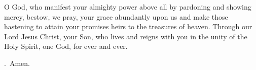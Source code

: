 \lettrine[lines=3]{O}{} God, who manifest your almighty power above all by pardoning and showing mercy, bestow, we pray, your grace abundantly upon us and make those hastening to attain your promises heirs to the treasures of heaven. Through our Lord Jesus Christ, your Son, who lives and reigns with you in the unity of the Holy Spirit, one God, for ever and ever. \par \Rbar.~Amen.
